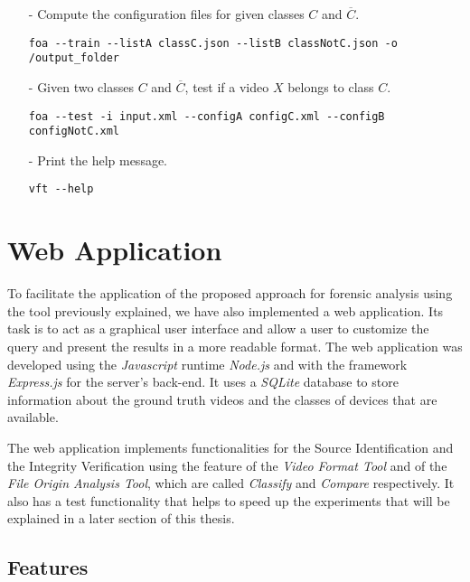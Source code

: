 \begin{itemize}

\item[-] Compute the configuration files for given classes $C$ and $\overline{C}$.
\begin{lstlisting}
foa --train --listA classC.json --listB classNotC.json -o /output_folder
\end{lstlisting}

\item[-] Given two classes $C$ and $\overline{C}$, test if a video $X$ belongs to class $C$.
\begin{lstlisting}
foa --test -i input.xml --configA configC.xml --configB configNotC.xml
\end{lstlisting}

\item[-] Print the help message.
\begin{lstlisting}
vft --help
\end{lstlisting}

\end{itemize}

\section{Web Application}

To facilitate the application of the proposed approach for forensic analysis using the tool previously explained, we have also implemented a web application. Its task is to act as a graphical user interface and allow a user to customize the query and present the results in a more readable format. The web application was developed using the \emph{Javascript} runtime \emph{Node.js} \cite{node} and with the framework \emph{Express.js} \cite{express} for the server's back-end. It uses a \emph{SQLite} database to store information about the ground truth videos and the classes of devices that are available.

The web application implements functionalities for the Source Identification and the Integrity Verification using the feature of the \emph{Video Format Tool} and of the \emph{File Origin Analysis Tool}, which are called \emph{Classify} and \emph{Compare} respectively.
It also has a test functionality that helps to speed up the experiments that will be explained in a later section of this thesis.

\subsection{Features}

